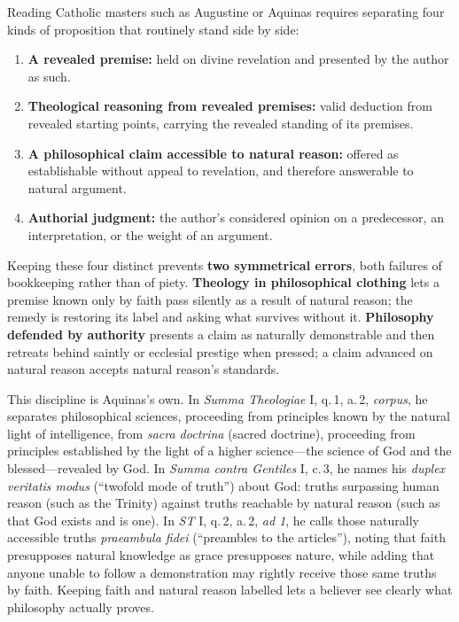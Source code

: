 Reading Catholic masters such as Augustine or Aquinas requires separating four kinds of proposition that routinely stand side by side:

\begin{enumerate}
\item \textbf{A revealed premise:} held on divine revelation and presented by the author as such.
\item \textbf{Theological reasoning from revealed premises:} valid deduction from revealed starting points, carrying the revealed standing of its premises.
\item \textbf{A philosophical claim accessible to natural reason:} offered as establishable without appeal to revelation, and therefore answerable to natural argument.
\item \textbf{Authorial judgment:} the author's considered opinion on a predecessor, an interpretation, or the weight of an argument.
\end{enumerate}

Keeping these four distinct prevents \textbf{two symmetrical errors}, both failures of bookkeeping rather than of piety. \textbf{Theology in philosophical clothing} lets a premise known only by faith pass silently as a result of natural reason; the remedy is restoring its label and asking what survives without it. \textbf{Philosophy defended by authority} presents a claim as naturally demonstrable and then retreats behind saintly or ecclesial prestige when pressed; a claim advanced on natural reason accepts natural reason's standards.

This discipline is Aquinas's own. In \emph{Summa Theologiae} I, q.\,1, a.\,2, \emph{corpus}, he separates philosophical sciences, proceeding from principles known by the natural light of intelligence, from \emph{sacra doctrina} (sacred doctrine), proceeding from principles established by the light of a higher science---the science of God and the blessed---revealed by God. In \emph{Summa contra Gentiles} I, c.\,3, he names his \emph{duplex veritatis modus} (``twofold mode of truth'') about God: truths surpassing human reason (such as the Trinity) against truths reachable by natural reason (such as that God exists and is one). In \emph{ST} I, q.\,2, a.\,2, \emph{ad 1}, he calls those naturally accessible truths \emph{praeambula fidei} (``preambles to the articles''), noting that faith presupposes natural knowledge as grace presupposes nature, while adding that anyone unable to follow a demonstration may rightly receive those same truths by faith. Keeping faith and natural reason labelled lets a believer see clearly what philosophy actually proves.

